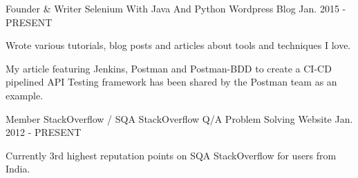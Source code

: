 


\begin{cventries}

  \cventry
    {Founder \& Writer} %
    {Selenium With Java And Python} %
    {Wordpress Blog} %
    {Jan. 2015 - PRESENT} %
    {
      \begin{cvitems} %
        \item {Wrote various tutorials, blog posts and articles about tools and techniques I love.}
        \item{My article featuring Jenkins, Postman and Postman-BDD to create a CI-CD pipelined API Testing framework has been shared by the Postman team as an example.}
      \end{cvitems}
    }

\cventry
    {Member} %
    {StackOverflow / SQA StackOverflow} %
    {Q/A Problem Solving Website} %
    {Jan. 2012 - PRESENT} %
    {
      \begin{cvitems} %
        \item {Currently 3rd highest reputation points on SQA StackOverflow for users from India.}
      \end{cvitems}
    }

\end{cventries}
